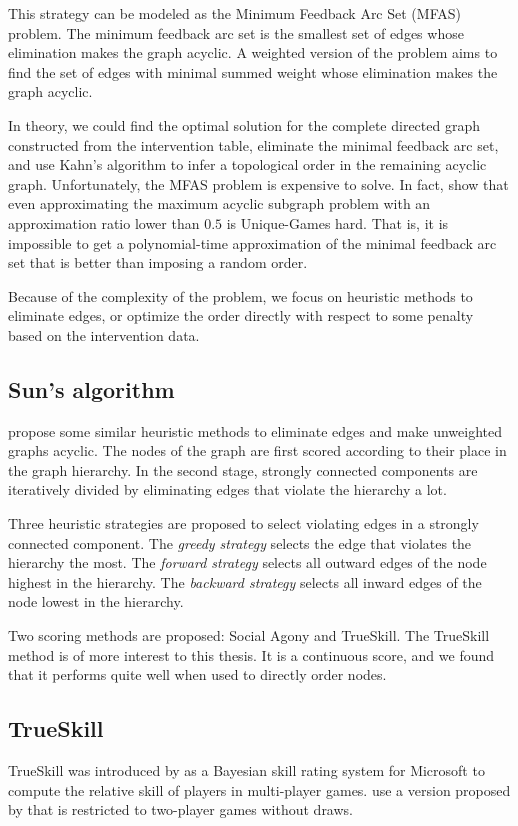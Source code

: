 This strategy can be modeled as the Minimum Feedback Arc Set (MFAS) problem. The minimum feedback arc set is the smallest set of edges whose elimination makes the graph acyclic. A weighted version of the problem aims to find the set of edges with minimal summed weight whose elimination makes the graph acyclic.

In theory, we could find the optimal solution for the complete directed graph constructed from the intervention table, eliminate the minimal feedback arc set, and use Kahn's algorithm to infer a topological order in the remaining acyclic graph. Unfortunately, the MFAS problem is expensive to solve. In fact, \citet{guruswami2008beating} show that even approximating the maximum acyclic subgraph problem with an approximation ratio lower than $0.5$ is Unique-Games hard. That is, it is impossible to get a polynomial-time approximation of the minimal feedback arc set that is better than imposing a random order.

Because of the complexity of the problem, we focus on heuristic methods to eliminate edges, or optimize the order directly with respect to some penalty based on the intervention data.

\subsection{Sun's algorithm}
\citet{sun2017breaking} propose some similar heuristic methods to eliminate edges and make unweighted graphs acyclic. The nodes of the graph are first scored according to their place in the graph hierarchy. In the second stage, strongly connected components are iteratively divided by eliminating edges that violate the hierarchy a lot. 

Three heuristic strategies are proposed to select violating edges in a strongly connected component. The \textit{greedy strategy} selects the edge that violates the hierarchy the most. The \textit{forward strategy} selects all outward edges of the node highest in the hierarchy. The \textit{backward strategy} selects all inward edges of the node lowest in the hierarchy. 

Two scoring methods are proposed: Social Agony and TrueSkill. The TrueSkill method is of more interest to this thesis. It is a continuous score, and we found that it performs quite well when used to directly order nodes.

\subsection{TrueSkill}
TrueSkill was introduced by \citet{herbrich2007trueskill} as a Bayesian skill rating system for Microsoft to compute the relative skill of players in multi-player games. \citet{sun2017breaking} use a version proposed by \citet{liu2013question} that is restricted to two-player games without draws. 




